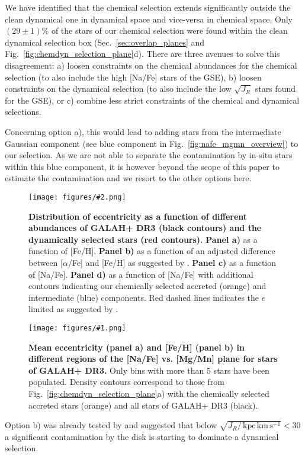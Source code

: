 \documentclass[fleqn,usenatbib]{mnras}
\newcommand{\kpckms}{\,\mathrm{kpc\,km\,s^{-1}}}	%
\newcommand{\codeicon}{{\faCloudDownload}}
\newcommand{\codelink}[1]{\href{https://github.com/svenbuder/Accreted-stars-in-GALAH-DR3/tree/main/figures/#1.ipynb}{\codeicon}\,\,}
\newcommand{\oscaption}[2]{\caption{#2 \codelink{#1}}}
\newcommand{\figuretextwidth}[4]{\begin{figure*} \centering \texttt{[image: figures/\#2.png]}\oscaption{#3}{#4}\label{fig:#2} \end{figure*}}
\newcommand{\figurecolumnwidth}[3]{\begin{figure} \centering \texttt{[image: figures/\#1.png]}\oscaption{#2}{#3}\label{fig:#1} \end{figure}}
\begin{document}
We have identified that the chemical selection extends significantly outside the clean dynamical one in dynamical space and vice-versa in chemical space. Only $(29\pm1)\%$ of the stars of our chemical selection were found within the clean dynamical selection box (Sec.~\ref{sec:overlap_planes} and Fig.~\ref{fig:chemdyn_selection_plane}d). There are three avenues to solve this disagreement:
a) loosen constraints on the chemical abundances for the chemical selection (to also include the high [Na/Fe] stars of the GSE), 
b) loosen constraints on the dynamical selection (to also include the low $\sqrt{J_R}$ stars found for the GSE), or 
c) combine less strict constraints of the chemical and dynamical selections.

Concerning option a), this would lead to adding stars from the intermediate Gaussian component (see blue component in Fig.~\ref{fig:nafe_mgmn_overview}) to our selection. As we are not able to separate the contamination by in-situ stars within this blue component, it is however beyond the scope of this paper to estimate the contamination and we resort to the other options here.

\figuretextwidth{17cm}{nafe_e}{chronochemodynamic_comparison}{
\textbf{Distribution of eccentricity as a function of different abundances of GALAH+ DR3 (black contours) and the dynamically selected stars (red contours).}
\textbf{Panel a)} as a function of [Fe/H].
\textbf{Panel b)} as a function of an adjusted difference between [$\alpha$/Fe] and [Fe/H] as suggested by \citet{Naidu2020}.
\textbf{Panel c)} as a function of [Na/Fe].
\textbf{Panel d)} as a function of [Na/Fe] with additional contours indicating our chemically selected accreted (orange) and intermediate (blue) components.
Red dashed lines indicates the $e$ limited as suggested by \citet{Naidu2020}.
}

\figurecolumnwidth{NaFe_MgMn_Fe_H_ecc}{chronochemodynamic_comparison}{
\textbf{Mean eccentricity (panel a) and [Fe/H] (panel b) in different regions of the [Na/Fe] vs. [Mg/Mn] plane for stars of GALAH+ DR3.}
Only bins with more than 5 stars have been populated.
Density contours correspond to those from Fig.~\ref{fig:chemdyn_selection_plane}a) with the chemically selected accreted stars (orange) and all stars of GALAH+ DR3 (black).
}

Option b) was already tested by \citet{Feuillet2020} and suggested that below $\sqrt{J_R / \kpckms} < 30$ a significant contamination by the disk is starting to dominate a dynamical selection.
\end{document}
